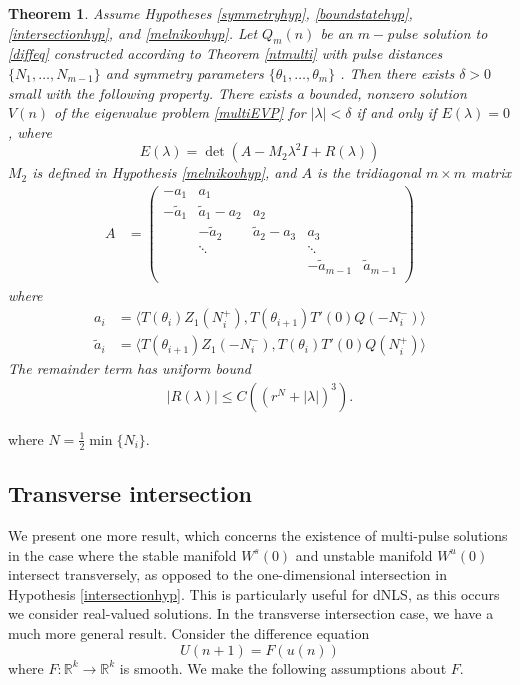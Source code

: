 \documentclass[12pt]{article}
\def\R{{\mathbb R}}
\newtheorem{theorem}{Theorem}
\begin{document}
\begin{theorem}\label{stabilitytheorem}
Assume Hypotheses \ref{symmetryhyp}, \ref{boundstatehyp}, \ref{intersectionhyp}, and \ref{melnikovhyp}. Let $Q_m(n)$ be an $m-$pulse solution to \eqref{diffeq} constructed according to Theorem \ref{ntmulti} with pulse distances $\{ N_1, \dots, N_{m-1}\}$ and symmetry parameters $\{\theta_1, \dots, \theta_m\}$ 
. Then there exists $\delta > 0$ small with the following property. There exists a bounded, nonzero solution $V(n)$ of the eigenvalue problem \eqref{multiEVP} for $|\lambda| < \delta$ if and only if $E(\lambda) = 0$, where
\begin{equation}\label{Elambda}
E(\lambda) = \det(A - M_2 \lambda^2 I + R(\lambda))
\end{equation}
$M_2$ is defined in Hypothesis \ref{melnikovhyp}, and $A$ is the tridiagonal $m \times m$ matrix
\begin{align}\label{matrixA}
A &= \begin{pmatrix}
-a_1 & a_1 & & & \\
-\tilde{a}_1 & \tilde{a}_1 - a_2 & a_2 \\
& -\tilde{a}_2 & \tilde{a}_2 - a_3 & a_3 \\
& \ddots & & \ddots \\
& & & -\tilde{a}_{m-1} & \tilde{a}_{m-1}  \\
\end{pmatrix}
\end{align}
where
\begin{align*}
a_i &= \langle T(\theta_i) Z_1(N_i^+), T(\theta_{i+1}) T'(0)Q(-N_i^-) \rangle \\
\tilde{a}_i &= \langle T(\theta_{i+1}) Z_1(-N_i^-), T(\theta_i) T'(0)Q(N_i^+) \rangle
\end{align*}
The remainder term has uniform bound
\begin{align}\label{Rbound2}
|R(\lambda)| \leq C\left( (r^N + |\lambda|)^3 \right).
\end{align}
\end{theorem}
where $N = \frac{1}{2}\min\{N_i\}$.

\subsection{Transverse intersection}

We present one more result, which concerns the existence of multi-pulse solutions in the case where the stable manifold $W^s(0)$ and unstable manifold $W^u(0)$ intersect transversely, as opposed to the one-dimensional intersection in Hypothesis \ref{intersectionhyp}. This is particularly useful for dNLS, as this occurs we consider real-valued solutions. In the transverse intersection case, we have a much more general result. Consider the difference equation
\begin{equation}\label{diffeqtransv}
U(n+1) = F(u(n))
\end{equation}
where $F: \R^k \rightarrow \R^k$ is smooth. We make the following assumptions about $F$.
\end{document}
